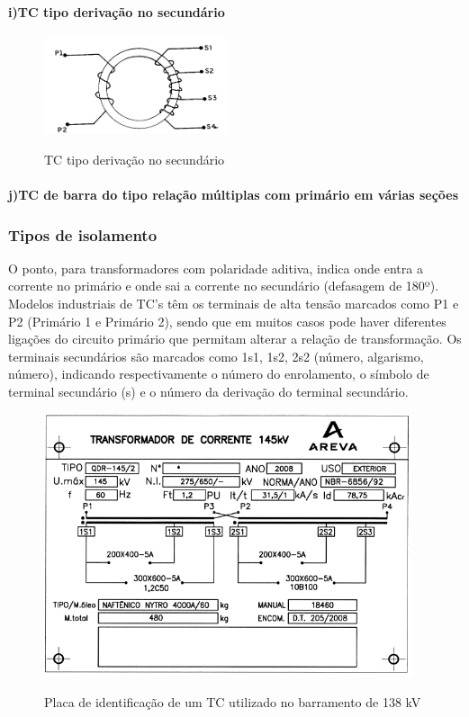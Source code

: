 \documentclass[a5paper,english,spanish,brazil]{ufsc-thesis}
\begin{document}
				\paragraph*{i)\indent TC tipo derivação no secundário}
					\begin{figure}[htb]
						\caption{TC tipo derivação no secundário}
						\centering
						\includegraphics[width=5.4cm]{TC(9).png}
						\label{fig:tci}
					\end{figure}
				\paragraph*{j)\indent TC de barra do tipo relação múltiplas com primário em várias seções}
			\subsubsection{Tipos de isolamento}

		O ponto, para transformadores com polaridade aditiva, indica onde entra a corrente no primário e onde sai a corrente no secundário (defasagem de 180º). Modelos industriais de TC’s têm os terminais de alta tensão marcados como P1 e P2 (Primário 1 e Primário 2), sendo que em muitos casos pode haver diferentes ligações do circuito primário que permitam alterar a relação de transformação. Os terminais secundários são marcados como 1s1, 1s2, 2s2 (número, algarismo, número), indicando respectivamente o número do enrolamento, o símbolo de terminal secundário (s) e o número da derivação do terminal secundário.\par
		\begin{figure}[htb]
		  \caption{Placa de identificação de um TC utilizado no barramento de 138 kV}
		  \centering
		  \includegraphics[width=10.8cm]{placatc.jpg}
		  \label{fig:placatc}
		\end{figure}
\end{document}
